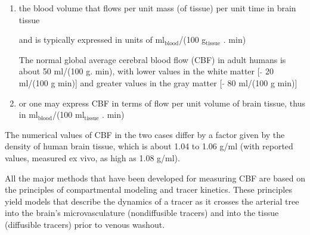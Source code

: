 \begin{enumerate}
  \item   the blood volume that flows per unit mass (of tissue) per unit time in
  brain tissue 
  
  and is typically expressed in units of ml$_\text{blood}$/(100
  g$_\text{tissue}$ . min)
  
  The normal global average cerebral blood flow (CBF) in adult humans is about
  50  ml/(100  g. min), with lower values in the white matter [ $\tilde{}$ 20
  ml/(100  g min)] and greater values in the gray matter [ $\tilde{}$ 80  ml/(100 
  g min)]
  
  \item or one may express CBF in terms of flow per unit volume of brain tissue,
  thus in  ml$_\text{blood}$/(100 ml$_\text{tissue}$ . min)
    
\end{enumerate}
  The numerical values of CBF in the two cases differ by a factor given by the
  density of human brain tissue, which is about 1.04 to 1.06  g/ml (with
  reported values, measured ex vivo, as high as 1.08  g/ml). 

All the major methods that have been developed for measuring CBF are based on
the principles of compartmental modeling and tracer kinetics.
These principles yield models that describe the dynamics of a tracer as it
crosses the arterial tree into the brain's microvasculature (nondiffusible
tracers) and into the tissue (diffusible tracers) prior to venous washout.

